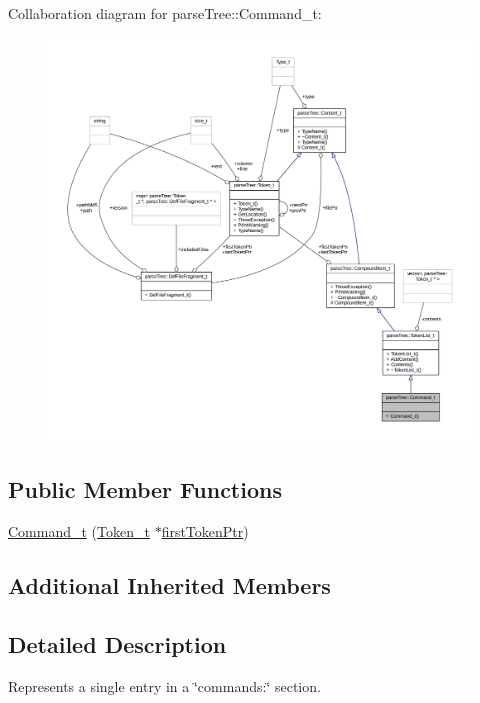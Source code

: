 Collaboration diagram for parse\+Tree\+:\+:Command\+\_\+t\+:
\nopagebreak
\begin{figure}[H]
\begin{center}
\leavevmode
\includegraphics[width=350pt]{structparse_tree_1_1_command__t__coll__graph}
\end{center}
\end{figure}
\subsection*{Public Member Functions}
\begin{DoxyCompactItemize}
\item 
\hyperlink{structparse_tree_1_1_command__t_a3f60bfa5ca2124aaed6058dace7c6116}{Command\+\_\+t} (\hyperlink{structparse_tree_1_1_token__t}{Token\+\_\+t} $\ast$\hyperlink{structparse_tree_1_1_compound_item__t_a587020c943e760cb0152dd8cd31e21ef}{first\+Token\+Ptr})
\end{DoxyCompactItemize}
\subsection*{Additional Inherited Members}


\subsection{Detailed Description}
Represents a single entry in a \char`\"{}commands\+:\char`\"{} section. 

